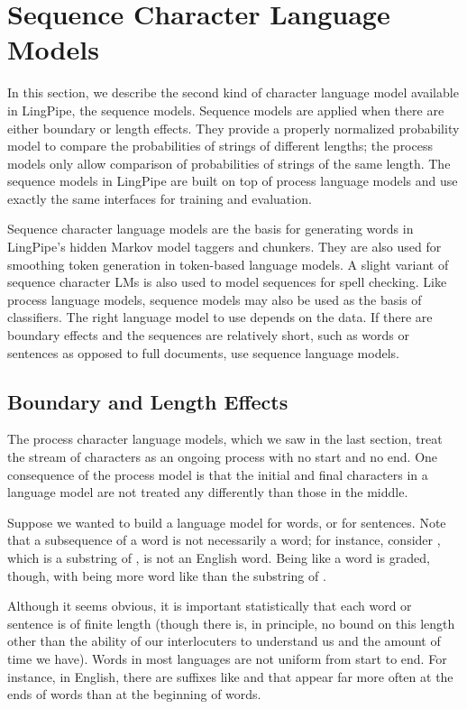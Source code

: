 \section{Sequence Character Language Models}

In this section, we describe the second kind of character language
model available in LingPipe, the sequence models.  Sequence models are
applied when there are either boundary or length effects.  They
provide a properly normalized probability model to compare the
probabilities of strings of different lengths; the process models only
allow comparison of probabilities of strings of the same length.  The
sequence models in LingPipe are built on top of process language
models and use exactly the same interfaces for training and evaluation.

Sequence character language models are the basis for generating words
in LingPipe's hidden Markov model taggers and chunkers.  They are also
used for smoothing token generation in token-based language models.  A
slight variant of sequence character LMs is also used to model
sequences for spell checking.  Like process language models, sequence
models may also be used as the basis of classifiers.  The right
language model to use depends on the data.  If there are boundary
effects and the sequences are relatively short, such as words or
sentences as opposed to full documents, use sequence language models.

\subsection{Boundary and Length Effects}

The process character language models, which we saw in the last
section, treat the stream of characters as an ongoing process with no
start and no end.  One consequence of the process model is that the
initial and final characters in a language model are not treated any
differently than those in the middle. 

Suppose we wanted to build a language model for words, or for
sentences.  Note that a subsequence of a word is not necessarily a
word; for instance, consider , which is a
substring of , is not an English word.
Being like a word is graded, though, with 
being more word like than the substring  of 
.

Although it seems obvious, it is important statistically that each
word or sentence is of finite length (though there is, in principle,
no bound on this length other than the ability of our interlocuters to
understand us and the amount of time we have).  Words in most
languages are not uniform from start to end.  For instance, in
English, there are suffixes like  and
 that appear far more often at the ends of words than
at the beginning of words.  

